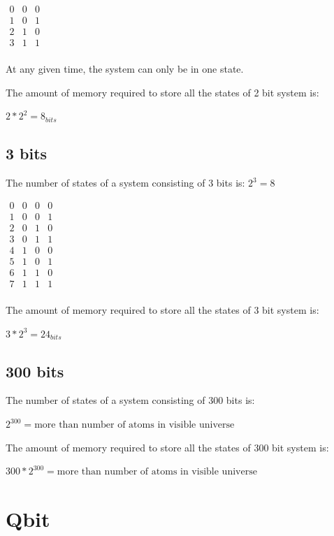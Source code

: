 \documentclass{article}
\begin{document}
$
\begin{array}{c|cc}
0 & 0 & 0 \\
1 & 0 & 1 \\
2 & 1 & 0 \\
3 & 1 & 1 \\
\end{array}
$


At any given time, the system can only be in one state.

The amount of memory required to store all the states of 2 bit system is:

$2 * 2^2 = 8_{bits}$


\subsection{3 bits}

The number of states of a system consisting of 3 bits is: $2^3=8$


$
\begin{array}{c|ccc}
0 & 0 & 0 & 0 \\
1 & 0 & 0 & 1 \\
2 & 0 & 1 & 0 \\
3 & 0 & 1 & 1 \\
4 & 1 & 0 & 0 \\
5 & 1 & 0 & 1 \\
6 & 1 & 1 & 0 \\
7 & 1 & 1 & 1 \\
\end{array}
$

The amount of memory required to store all the states of 3 bit system is:

$3 * 2^3 = 24_{bits}$

\newpage

\subsection{300 bits}

The number of states of a system consisting of 300 bits is: 

$2^{300}=\textrm{more than number of atoms in visible universe}$ 

The amount of memory required to store all the states of 300 bit system is:


$300 * 2^{300}=\textrm{more than number of atoms in visible universe}$ 


\section{Qbit}
\end{document}

